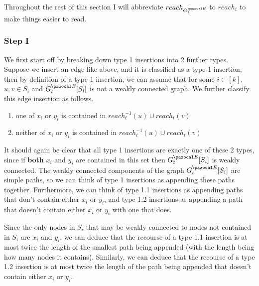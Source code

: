 \documentclass{report}
\begin{document}

Throughout the rest of this section I will abbreviate $reach_{G_{t}^{\pazocal E}}$ to $reach_t$ to make things easier to read.

\subsubsection{Step I}

We first start off by breaking down type 1 insertions into 2 further types. Suppose we insert an edge like above, and it is classified as a type 1 insertion, then by definition of a type 1 insertion, we can assume that for some $i \in [k]$, $u,v \in S_{i}$ and $G_{t}^{\pazocal E}[S_{i}]$ is not a weakly connected graph. We further classify this edge insertion as follows.

\begin{enumerate}[Type {1}.1]
    \item one of $x_{i}$ or $y_{i}$ is contained in $reach^{-1}_t(u) \cup reach_t(v)$
    \item neither of $x_{i}$ or $y_{i}$ is contained in $reach^{-1}_t(u) \cup reach_t(v)$
\end{enumerate}

It should again be clear that all type 1 insertions are exactly one of these 2 types, since if \textbf{both} $x_i$ and $y_i$ are contained in this set then $G_{t}^{\pazocal E}[S_{i}]$ is weakly connected. The weakly connected components of the graph $G_{t}^{\pazocal E}[S_{i}]$ are simple paths, so we can think of type 1 insertions as appending these paths together. Furthermore, we can think of type 1.1 insertions as appending paths that don't contain either $x_{i}$ or $y_{i}$, and type 1.2 insertions as appending a path that doesn't contain either $x_{i}$ or $y_{i}$ with one that does. 

Since the only nodes in $S_{i}$ that may be weakly connected to nodes not contained in $S_{i}$ are $x_{i}$ and $y_{i}$, we can deduce that the recourse of a type 1.1 insertion is at most twice the length of the smallest path being appended (with the length being how many nodes it contains). Similarly, we can deduce that the recourse of a type 1.2 insertion is at most twice the length of the path being appended that doesn't contain either $x_{i}$ or $y_{i}$.
\end{document}
